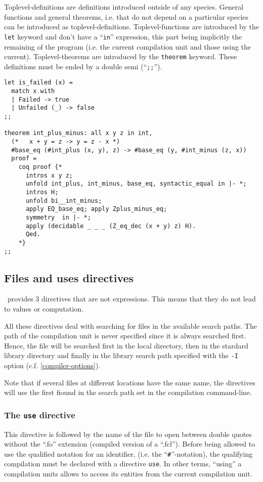 Toplevel-definitions are definitions introduced outside of any
species. General functions and general theorems, i.e. that do not
depend on a particular species can be introduced as
toplevel-definitions. Toplevel-functions are introduced by the {\tt
  let} keyword and don't have a ``{\tt in}'' expression, this part
being implicitly the remaining of the program (i.e. the current
compilation unit and those using the current).  Toplevel-theorems are
introduced by the {\tt theorem} keyword. These definitions must be ended by a double semi
(``{\tt ;;}'').  {\scriptsize
\begin{lstlisting}
let is_failed (x) =
  match x with
  | Failed -> true
  | Unfailed (_) -> false
;;

theorem int_plus_minus: all x y z in int,
  (*   x + y = z -> y = z - x *)
  #base_eq (#int_plus (x, y), z) -> #base_eq (y, #int_minus (z, x))
  proof =
    coq proof {*
      intros x y z;
      unfold int_plus, int_minus, base_eq, syntactic_equal in |- *;
      intros H;
      unfold bi__int_minus;
      apply EQ_base_eq; apply Zplus_minus_eq;
      symmetry  in |- *;
      apply (decidable _ _ _ (Z_eq_dec (x + y) z) H).
      Qed.
    *}
;;
\end{lstlisting}
}



\subsection{Files and uses directives}
\label{file directive}
\focal\ provides 3 directives that are not expressions. This means
that they do not lead to values or computation.

All these directives deal with searching for files in the available
search paths. The path of the compilation unit is never specified
since it is always searched first. Hence, the file will be searched
first in the local directory, then in the stardard library directory
and finally in the library search path specified with the {\tt -I}
option (c.f. \ref{compiler-options}).

Note that if several files at different locations have the same name,
the directives will use the first fiound in the search path set in the
compilation command-line.


\subsubsection{The {\tt use} directive}
This directive is followed by the name of the file to open between
double quotes without the ``.fo'' extension (compiled version of a ``.fcl'').
Before being allowed to use the qualified notation for an identifier,
(i.e. the ``{\tt\#}''-notation), the qualifying compilation must be
declared with a directive {\tt use}. In other terms,
``using'' a compilation units allows to access its entities from the
current compilation unit.


